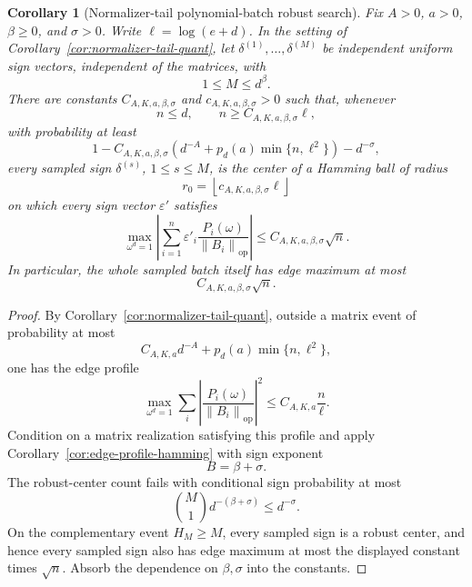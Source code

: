 \documentclass[11pt]{amsart}
\numberwithin{equation}{section}
\newtheorem{corollary}[theorem]{Corollary}
\theoremstyle{definition}
\theoremstyle{remark}
\newcommand{\op}{\mathrm{op}}
\newcommand{\norm}[1]{\left\lVert #1\right\rVert}
\newcommand{\eps}{\varepsilon}
\begin{document}
\begin{corollary}[Normalizer-tail polynomial-batch robust search]
\label{cor:normalizer-tail-poly-batch}
Fix \(A>0\), \(a>0\), \(\beta\ge0\), and \(\sigma>0\).  Write
\(\ell=\log(e+d)\).  In the setting of
Corollary~\ref{cor:normalizer-tail-quant}, let
\(\delta^{(1)},\ldots,\delta^{(M)}\) be independent uniform sign vectors,
independent of the matrices, with
\[
  1\le M\le d^\beta .
\]
There are constants \(C_{A,K,a,\beta,\sigma}\) and
\(c_{A,K,a,\beta,\sigma}>0\) such that, whenever
\[
  n\le d,\qquad n\ge C_{A,K,a,\beta,\sigma}\ell ,
\]
with probability at least
\[
  1-C_{A,K,a,\beta,\sigma}
  \left(d^{-A}+p_d(a)\min\{n,\ell^2\}\right)-d^{-\sigma},
\]
every sampled sign \(\delta^{(s)}\), \(1\le s\le M\), is the center of a
Hamming ball of radius
\[
  r_0=\left\lfloor c_{A,K,a,\beta,\sigma}\ell\right\rfloor
\]
on which every sign vector \(\eps'\) satisfies
\[
  \max_{\omega^d=1}\left|\sum_{i=1}^n
  \eps'_i\frac{P_i(\omega)}{\norm{B_i}_{\op}}\right|
  \le C_{A,K,a,\beta,\sigma}\sqrt n .
\]
In particular, the whole sampled batch itself has edge maximum at most
\[
  C_{A,K,a,\beta,\sigma}\sqrt n .
\]
\end{corollary}

\begin{proof}
By Corollary~\ref{cor:normalizer-tail-quant}, outside a matrix event of
probability at most
\[
  C_{A,K,a}d^{-A}+p_d(a)\min\{n,\ell^2\},
\]
one has the edge profile
\[
  \max_{\omega^d=1}\sum_i
  \left|\frac{P_i(\omega)}{\norm{B_i}_{\op}}\right|^2
  \le C_{A,K,a}\frac n\ell .
\]
Condition on a matrix realization satisfying this profile and apply
Corollary~\ref{cor:edge-profile-hamming} with sign exponent
\[
  B=\beta+\sigma .
\]
The robust-center count fails with conditional sign probability at most
\[
  \binom{M}{1}d^{-(\beta+\sigma)}
  \le d^{-\sigma}.
\]
On the complementary event \(H_M\ge M\), every sampled sign is a robust center,
and hence every sampled sign also has edge maximum at most the displayed
constant times \(\sqrt n\).  Absorb the dependence on \(\beta,\sigma\) into the
constants.
\end{proof}
\end{document}
